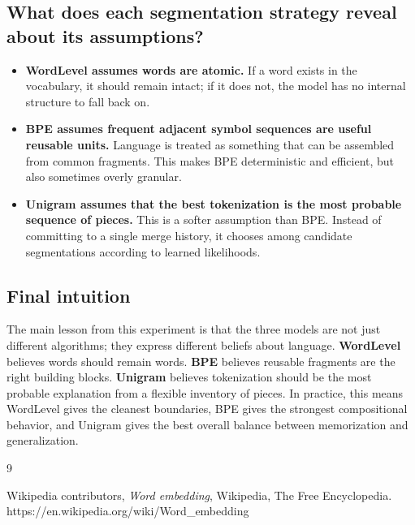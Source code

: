 \documentclass{article}
\begin{document}
\subsection{What does each segmentation strategy reveal about its assumptions?}

\begin{itemize}
    \item \textbf{WordLevel assumes words are atomic.} If a word exists in the vocabulary, it should remain intact; if it does not, the model has no internal structure to fall back on.
    \item \textbf{BPE assumes frequent adjacent symbol sequences are useful reusable units.} Language is treated as something that can be assembled from common fragments. This makes BPE deterministic and efficient, but also sometimes overly granular.
    \item \textbf{Unigram assumes that the best tokenization is the most probable sequence of pieces.} This is a softer assumption than BPE. Instead of committing to a single merge history, it chooses among candidate segmentations according to learned likelihoods.
\end{itemize}

\subsection{Final intuition}

The main lesson from this experiment is that the three models are not just different algorithms; they express different beliefs about language. \textbf{WordLevel} believes words should remain words. \textbf{BPE} believes reusable fragments are the right building blocks. \textbf{Unigram} believes tokenization should be the most probable explanation from a flexible inventory of pieces. In practice, this means WordLevel gives the cleanest boundaries, BPE gives the strongest compositional behavior, and Unigram gives the best overall balance between memorization and generalization.


\begin{thebibliography}{9}

Wikipedia contributors,
\textit{Word embedding},
Wikipedia, The Free Encyclopedia.
https://en.wikipedia.org/wiki/Word\_embedding

\end{thebibliography}
\end{document}
